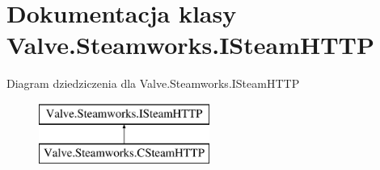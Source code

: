 \hypertarget{class_valve_1_1_steamworks_1_1_i_steam_h_t_t_p}{}\section{Dokumentacja klasy Valve.\+Steamworks.\+I\+Steam\+H\+T\+TP}
\label{class_valve_1_1_steamworks_1_1_i_steam_h_t_t_p}
Diagram dziedziczenia dla Valve.\+Steamworks.\+I\+Steam\+H\+T\+TP\begin{figure}[H]
\begin{center}
\leavevmode
\includegraphics[height=2.000000cm]{class_valve_1_1_steamworks_1_1_i_steam_h_t_t_p}
\end{center}
\end{figure}
